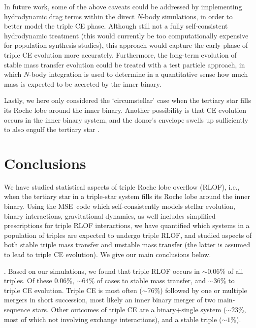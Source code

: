 \documentclass[twocolumn,appendixfloats,tighten]{aastex631}
\newcommand{\mse}{\textsc{MSE}}
\begin{document}
In future work, some of the above caveats could be addressed by implementing hydrodynamic drag terms within the direct $N$-body simulations, in order to better model the triple CE phase. Although still not a fully self-consistent hydrodynamic treatment (this would currently be too computationally expensive for population synthesis studies), this approach would capture the early phase of triple CE evolution more accurately. Furthermore, the long-term evolution of stable mass transfer evolution could be treated with a test particle approach, in which $N$-body integration is used to determine in a quantitative sense how much mass is expected to be accreted by the inner binary. 

Lastly, we here only considered the `circumstellar' case when the tertiary star fills its Roche lobe around the inner binary. Another possibility is that CE evolution occurs in the inner binary system, and the donor's envelope swells up sufficiently to also engulf the tertiary star \citep[e.g.,][]{2021MNRAS.500.1921G}.



\section{Conclusions}
\label{sect:conclusions}
We have studied statistical aspects of triple Roche lobe overflow (RLOF), i.e., when the tertiary star in a triple-star system fills its Roche lobe around the inner binary. Using the \mse~code \citep{2021MNRAS.502.4479H} which self-consistently models stellar evolution, binary interactions, gravitational dynamics, as well includes simplified prescriptions for triple RLOF interactions, we have quantified which systems in a population of triples are expected to undergo triple RLOF, and studied aspects of both stable triple mass transfer and unstable mass transfer (the latter is assumed to lead to triple CE evolution). We give our main conclusions below. 

\medskip {}. Based on our simulations, we found that triple RLOF occurs in $\sim 0.06\%$ of all triples. Of these 0.06\%, $\sim 64\%$ of cases to stable mass transfer, and $\sim 36\%$ to triple CE evolution. Triple CE is most often ($\sim 76\%$) followed by one or multiple mergers in short succession, most likely an inner binary merger of two main-sequence stars. Other outcomes of triple CE are a binary+single system ($\sim 23\%$, most of which not involving exchange interactions), and a stable triple ($\sim 1\%$).
\end{document}

